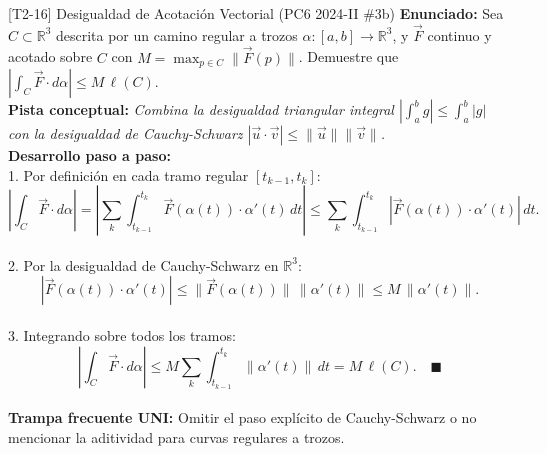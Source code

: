 \documentclass[11pt,a4paper]{article}
\begin{document}
\begin{ejerciciobox}{[T2-16] Desigualdad de Acotación Vectorial (PC6 2024-II \#3b)}
\textbf{Enunciado:} Sea $C \subset \mathbb{R}^3$ descrita por un camino regular a trozos $\alpha:[a,b]\to\mathbb{R}^3$, y $\vec{F}$ continuo y acotado sobre $C$ con $M = \max_{p \in C} \|\vec{F}(p)\|$. Demuestre que $\left|\int_C \vec{F}\cdot d\alpha\right| \le M\,\ell(C)$.\\[0.2cm]
\textbf{Pista conceptual:} \emph{Combina la desigualdad triangular integral $\left|\int_a^b g\right| \le \int_a^b |g|$ con la desigualdad de Cauchy-Schwarz $|\vec{u}\cdot\vec{v}| \le \|\vec{u}\|\|\vec{v}\|$.}\\[0.2cm]
\textbf{Desarrollo paso a paso:}\\
1. Por definición en cada tramo regular $[t_{k-1}, t_k]$:\\
$$\left|\int_C \vec{F}\cdot d\alpha\right| = \left|\sum_k \int_{t_{k-1}}^{t_k} \vec{F}(\alpha(t))\cdot\alpha'(t)\,dt\right| \le \sum_k \int_{t_{k-1}}^{t_k} |\vec{F}(\alpha(t))\cdot\alpha'(t)|\,dt.$$\\
2. Por la desigualdad de Cauchy-Schwarz en $\mathbb{R}^3$:\\
$$|\vec{F}(\alpha(t))\cdot\alpha'(t)| \le \|\vec{F}(\alpha(t))\|\,\|\alpha'(t)\| \le M\,\|\alpha'(t)\|.$$\\
3. Integrando sobre todos los tramos:\\
$$\left|\int_C \vec{F}\cdot d\alpha\right| \le M\sum_k \int_{t_{k-1}}^{t_k} \|\alpha'(t)\|\,dt = M\,\ell(C). \quad \blacksquare$$\\[0.2cm]
\textbf{Trampa frecuente UNI:} Omitir el paso explícito de Cauchy-Schwarz o no mencionar la aditividad para curvas regulares a trozos.
\end{ejerciciobox}
\end{document}
